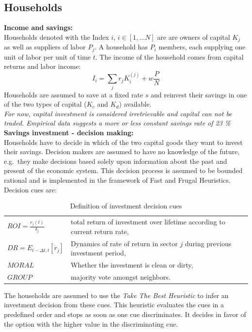 \subsection{Households}

\textbf{Income and savings:} \\
Households denoted with the Index $i$, $i \in [1, \dots N]$ are are owners of capital $K_j$ as well as suppliers of labor $P_j$. A household has $P_i$ members, each supplying one unit of labor per unit of time $t$. The income of the household comes from capital returns and labor income:
\begin{equation}
	I_i = \sum_j r_j K^{(j)}_{i} + w\frac{P}{N}
	\label{eq:household_income}
\end{equation}
Households are assumed to save at a fixed rate $s$ and reinvest their savings in one of the two types of capital ($K_c$ and $K_d$) available. \\
\textit{For now, capital investment is considered irretrievable and capital can not be traded. Empirical data suggests a more or less constant savings rate of 23 \%} \\

\textbf{Savings investment - decision making:} \\
Households have to decide in which of the two capital goods they want to invest their savings. Decision makers are assumed to have no knowledge of the future, e.g.\ they make decisions based solely upon information about the past and present of the economic system.
This decision process is assumed to be bounded rational and is implemented in the framework of Fast and Frugal Heuristics.\\
Decision cues are:
\begin{table}[H]
	\centering
	\begin{tabular}{ll}
		$ROI = \frac{r_j(t)}{\delta_j}$ & total return of investment over lifetime according to current return rate,\\
		$DR = E_{t-\Delta t, t}[\dot{r}_j]$ & Dynamics of rate of return in sector $j$ during previous investment period, \\
		$MORAL$ & Whether the investment is clean or dirty, \\
		$GROUP$ & majority vote amongst neighbors. \\
	\end{tabular}
	\caption{Definition of investment decision cues}
	\label{tab:decision_cues}
\end{table}
The households are assumed to use the \textit{Take The Best Heuristic} to infer an investment decision from these cues. This heuristic evaluates the cues in a predefined order and stops as soon as one cue discriminates. It decides in favor of the option with the higher value in the discriminating cue.

